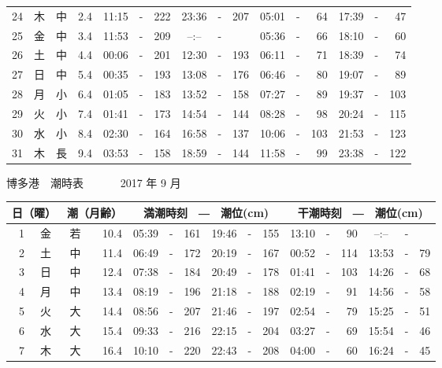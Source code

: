 \documentclass[12pt.a4j]{jsarticle}
\begin{document}
\begin{center}
\begin{table}[ht]
\begin{tabular}{|rc|cr|ccrccr|ccrccr|}
24 & 木 & 中 &  2.4 &  11:15 &-& 222  &  23:36 &-& 207  &   05:01 &-&  64  &   17:39 &-&  47  \\
25 & 金 & 中 &  3.4 &  11:53 &-& 209  &  --:-- &-&     &   05:36 &-&  66  &   18:10 &-&  60  \\
26 & 土 & 中 &  4.4 &  00:06 &-& 201  &  12:30 &-& 193  &   06:11 &-&  71  &   18:39 &-&  74  \\
27 & 日 & 中 &  5.4 &  00:35 &-& 193  &  13:08 &-& 176  &   06:46 &-&  80  &   19:07 &-&  89  \\
28 & 月 & 小 &  6.4 &  01:05 &-& 183  &  13:52 &-& 158  &   07:27 &-&  89  &   19:37 &-& 103  \\
29 & 火 & 小 &  7.4 &  01:41 &-& 173  &  14:54 &-& 144  &   08:28 &-&  98  &   20:24 &-& 115  \\
30 & 水 & 小 &  8.4 &  02:30 &-& 164  &  16:58 &-& 137  &   10:06 &-& 103  &   21:53 &-& 123  \\
31 & 木 & 長 &  9.4 &  03:53 &-& 158  &  18:59 &-& 144  &   11:58 &-&  99  &   23:38 &-& 122  \\
   \hline
   \end{tabular}
\end{table}
\newpage
 {\LARGE 博多港　潮時表　　　}
 {\large 2017 年  9 月}\\
 \begin{table}[ht]
    \begin{tabular}{|rc|cr|ccrccr|ccrccr|}
    \hline
    \multicolumn{2}{|c|}{日（曜）} & \multicolumn{2}{c|}{潮（月齢）} & \multicolumn{6}{c|}{満潮時刻　―　潮位(cm)} & \multicolumn{6}{c|}{干潮時刻　―　潮位(cm)} \\
 \hline
 1 & 金 & 若 & 10.4 &  05:39 &-& 161  &  19:46 &-& 155  &   13:10 &-&  90  &   --:-- &-&     \\
 2 & 土 & 中 & 11.4 &  06:49 &-& 172  &  20:19 &-& 167  &   00:52 &-& 114  &   13:53 &-&  79  \\
 3 & 日 & 中 & 12.4 &  07:38 &-& 184  &  20:49 &-& 178  &   01:41 &-& 103  &   14:26 &-&  68  \\
 4 & 月 & 中 & 13.4 &  08:19 &-& 196  &  21:18 &-& 188  &   02:19 &-&  91  &   14:56 &-&  58  \\
 5 & 火 & 大 & 14.4 &  08:56 &-& 207  &  21:46 &-& 197  &   02:54 &-&  79  &   15:25 &-&  51  \\
 6 & 水 & 大 & 15.4 &  09:33 &-& 216  &  22:15 &-& 204  &   03:27 &-&  69  &   15:54 &-&  46  \\
 7 & 木 & 大 & 16.4 &  10:10 &-& 220  &  22:43 &-& 208  &   04:00 &-&  60  &   16:24 &-&  45  \\

\end{tabular}
\end{table}
\end{center}
\end{document}
